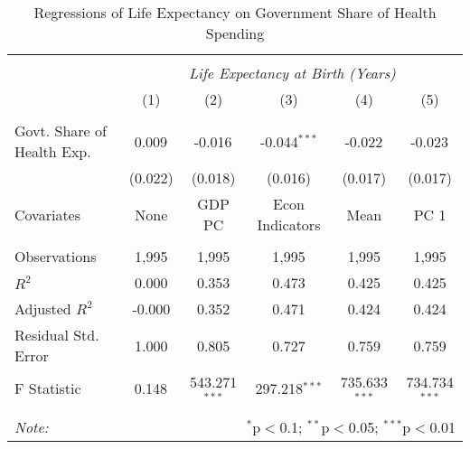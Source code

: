 \begin{table}[!htbp] \centering
  \caption{Regressions of Life Expectancy on Government Share of Health Spending \label{main_regs}}
\begin{tabular}{@{\extracolsep{5pt}}lccccc}
\\[-1.8ex]\hline
\hline \\[-1.8ex]
& \multicolumn{5}{c}{\textit{Life Expectancy at Birth (Years)}} \
\cr \
\\[-1.8ex] & (1) & (2) & (3) & (4) & (5) \\
\hline \\[-1.8ex]
 Govt. Share of Health Exp. & 0.009$^{}$ & -0.016$^{}$ & -0.044$^{***}$ & -0.022$^{}$ & -0.023$^{}$ \\
  & (0.022) & (0.018) & (0.016) & (0.017) & (0.017) \\
 Covariates & None & GDP PC & Econ Indicators & Mean & PC 1 \\
\hline \\[-1.8ex]
 Observations & 1,995 & 1,995 & 1,995 & 1,995 & 1,995 \\
 $R^2$ & 0.000 & 0.353 & 0.473 & 0.425 & 0.425 \\
 Adjusted $R^2$ & -0.000 & 0.352 & 0.471 & 0.424 & 0.424 \\
 Residual Std. Error & 1.000 & 0.805 & 0.727 & 0.759 & 0.759  \\
 F Statistic & 0.148$^{}$  & 543.271$^{***}$  & 297.218$^{***}$  & 735.633$^{***}$  & 734.734$^{***}$  \\
\hline
\hline \\[-1.8ex]
\textit{Note:} & \multicolumn{5}{r}{$^{*}$p$<$0.1; $^{**}$p$<$0.05; $^{***}$p$<$0.01} \\
\end{tabular}
\end{table}